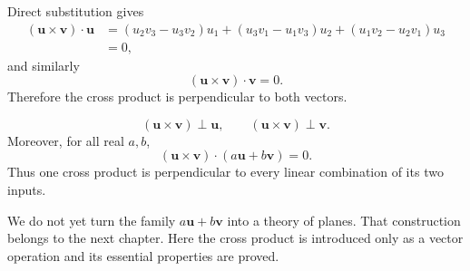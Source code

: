 \begin{proofbox}
Direct substitution gives
\[
\begin{aligned}
(\mathbf u\times\mathbf v)\cdot\mathbf u
&=(u_2v_3-u_3v_2)u_1
 +(u_3v_1-u_1v_3)u_2
 +(u_1v_2-u_2v_1)u_3\\
&=0,
\end{aligned}
\]
and similarly
\[
(\mathbf u\times\mathbf v)\cdot\mathbf v=0.
\]
Therefore the cross product is perpendicular to both vectors.
\end{proofbox}

\begin{theorembox}
\[
\boxed{
(\mathbf u\times\mathbf v)\perp\mathbf u,
\qquad
(\mathbf u\times\mathbf v)\perp\mathbf v
}.
\]
Moreover, for all real $a,b$,
\[
\boxed{
(\mathbf u\times\mathbf v)\cdot(a\mathbf u+b\mathbf v)=0
}.
\]
Thus one cross product is perpendicular to every linear combination of its two
inputs.
\end{theorembox}

\begin{center}
\end{center}

\begin{remarkbox}
We do not yet turn the family $a\mathbf u+b\mathbf v$ into a theory of planes.
That construction belongs to the next chapter. Here the cross product is
introduced only as a vector operation and its essential properties are proved.
\end{remarkbox}

